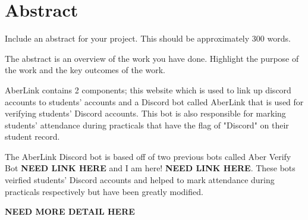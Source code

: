 \thispagestyle{empty}


\section*{\centering Abstract}

Include an abstract for your project. This should be approximately 300 words. 

The abstract is an overview of the work you have done. Highlight the purpose of the work and the key outcomes of the work.

AberLink contains 2 components; this website which is used to link up discord accounts to students' accounts and a Discord bot called AberLink that is used for verifying students' Discord accounts. This bot is also responsible for marking students' attendance during practicals that have the flag of "Discord" on their student record.

The AberLink Discord bot is based off of two previous bots called Aber Verify Bot \textbf{NEED LINK HERE} and I am here! \textbf{NEED LINK HERE}. These bots veirfied students' Discord accounts and helped to mark attendance during practicals respectively but have been greatly modified.

\textbf{NEED MORE DETAIL HERE}

